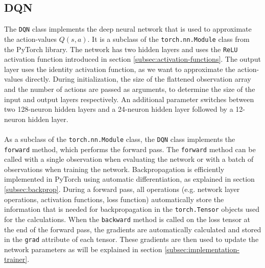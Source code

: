\subsection{DQN}
\label{subsec:implementation-dqn}
The \texttt{DQN} class implements the deep neural network that is used to approximate the action-values $Q(s,a)$. It is a subclass of the \texttt{torch.nn.Module} class from the PyTorch library. The network has two hidden layers and uses the \texttt{ReLU} activation function introduced in section \ref{subsec:activation-functions}. The output layer uses the identity activation function, as we want to approximate the action-values directly. During initialization, the size of the flattened observation array and the number of actions are passed as arguments, to determine the size of the input and output layers respectively. An additional parameter switches between two 128-neuron hidden layers and a 24-neuron hidden layer followed by a 12-neuron hidden layer. 
\\
\\
As a subclass of the \texttt{torch.nn.Module} class, the \texttt{DQN} class implements the \texttt{forward} method, which performs the forward pass. The \texttt{forward} method can be called with a single observation when evaluating the network or with a batch of observations when training the network. Backpropagation is efficiently implemented in PyTorch using automatic differentiation, as explained in section \ref{subsec:backprop}. During a forward pass, all operations (e.g. network layer operations, activation functions, loss function) automatically store the information that is needed for backpropagation in the \texttt{torch.Tensor} objects used for the calculations. When the \texttt{backward} method is called on the loss tensor at the end of the forward pass, the gradients are automatically calculated and stored in the \texttt{grad} attribute of each tensor. These gradients are then used to update the network parameters as will be explained in section \ref{subsec:implementation-trainer}.



